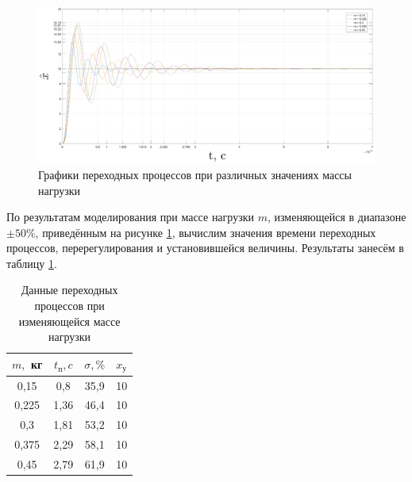 \documentclass[fleqn, a4paper, 11pt, russian]{article}
\begin{document}
	\begin{figure}[ht!]		
		\includegraphics[width = \textwidth]{mvar/mvarX}
		\caption{Графики переходных процессов при различных значениях массы нагрузки}
		\label{mvarGraph}
	\end{figure}
	\newpage
	По результатам моделирования при массе нагрузки $m$, изменяющейся в диапазоне $\pm50\%$, приведённым на рисунке \ref{mvarGraph}, вычислим значения времени переходных процессов, перерегулирования и установившейся величины. Результаты занесём в таблицу \ref{mvarTab}.
	\begin{table}[ht!]
		\centering
		\begin{threeparttable}
			\caption{Данные переходных процессов при изменяющейся массе нагрузки}
			\begin{tabular}{|c|c|c|c|}
				\hline
				$m,$ кг	& $t_\text{п}, c$	& $\sigma, \%$	& $x_\text{у}$\\\hline
				0,15	& 0,8				& 35,9			& 10\\\hline
				0,225	& 1,36				& 46,4			& 10\\\hline
				0,3		& 1,81				& 53,2			& 10\\\hline
				0,375	& 2,29				& 58,1			& 10\\\hline
				0,45	& 2,79				& 61,9			& 10\\\hline
			\end{tabular}
			\label{mvarTab}
		\end{threeparttable}
	\end{table}
	
\end{document}
